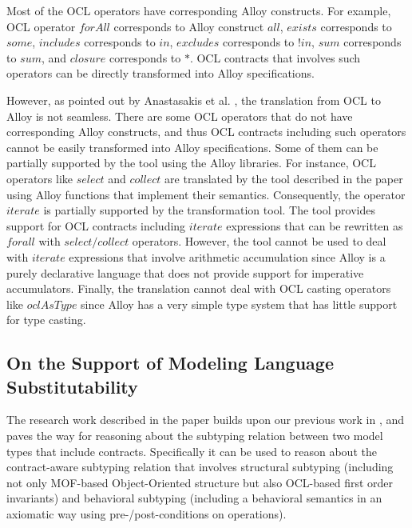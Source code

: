 Most of the OCL operators have corresponding Alloy constructs. For example, OCL operator $forAll$ corresponds to Alloy construct $all$, $exists$ corresponds to $some$, $includes$ corresponds to $in$, $excludes$ corresponds to $!in$, $sum$ corresponds to $sum$, and $closure$ corresponds to $*$. OCL contracts that involves such operators can be directly transformed into Alloy specifications.

However, as pointed out by Anastasakis et al. \cite{anastasakis2010challenges}, the translation from OCL to Alloy is not seamless. There are some OCL operators that do not have corresponding Alloy constructs, and thus OCL contracts including such operators cannot be easily transformed into Alloy specifications.  
%
Some of them can be partially supported by the tool using the Alloy libraries. For instance, OCL operators like $select$ and $collect$ are translated by the tool described in the paper using Alloy functions that implement their semantics. Consequently, the operator $iterate$ is partially supported by the transformation tool. The tool provides support for OCL contracts including $iterate$ expressions that can be rewritten as $forall$ with $select/collect$ operators. However, the tool cannot be used to deal with $iterate$ expressions that involve arithmetic accumulation since Alloy is a purely declarative language that does not provide support for imperative accumulators. Finally, the translation cannot deal with OCL casting operators like $oclAsType$ since Alloy has a very simple type system that has little support for type casting.


\subsection{On the Support of Modeling Language Substitutability}
\label{sec:discussion:substitutability}

The research work described in the paper builds upon our previous work in \cite{ecmfa12}, and paves the way for reasoning about the subtyping relation between two model types that include contracts. 
Specifically it can be used to reason about the contract-aware subtyping relation that involves structural subtyping (including not only MOF-based Object-Oriented structure but also OCL-based first order invariants) and behavioral subtyping (including a behavioral semantics in an axiomatic way using pre-/post-conditions on operations).

